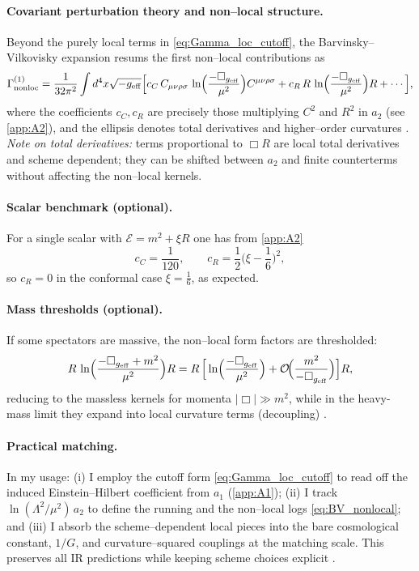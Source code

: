 \documentclass{iopjournal}
\begin{document}
\paragraph{Covariant perturbation theory and non–local structure.}
Beyond the purely local terms in \eqref{eq:Gamma_loc_cutoff}, the Barvinsky–Vilkovisky expansion resums the first non–local contributions as
\begin{equation}
\Gamma^{(1)}_{\rm nonloc}
=\frac{1}{32\pi^2}\int d^4x\sqrt{-g_{\rm eff}} 
\Big[
c_C\,C_{\mu\nu\rho\sigma}\,\ln\!\Big(\frac{-\Box_{g_{\rm eff}}}{\mu^2}\Big)C^{\mu\nu\rho\sigma}
+c_R\,R\,\ln\!\Big(\frac{-\Box_{g_{\rm eff}}}{\mu^2}\Big)R
+\cdots\Big],
\label{eq:BV_nonlocal}
\end{equation}
where the coefficients $c_C,c_R$ are precisely those multiplying $C^2$ and $R^2$ in $a_2$ (see \cref{app:A2}), and the ellipsis denotes total derivatives and higher–order curvatures \cite{BarvinskyVilkovisky1990,Donoghue1994}. \emph{Note on total derivatives:} terms proportional to $\Box R$ are local total derivatives and scheme dependent; they can be shifted between $a_2$ and finite counterterms without affecting the non–local kernels.

\paragraph{Scalar benchmark (optional).}
For a single scalar with $\mathcal{E}=m^2+\xi R$ one has from \cref{app:A2}
\begin{equation}
c_C=\frac{1}{120},\qquad
c_R=\frac{1}{2}\Big(\xi-\frac{1}{6}\Big)^{\!2},
\end{equation}
so $c_R=0$ in the conformal case $\xi=\tfrac{1}{6}$, as expected.

\paragraph{Mass thresholds (optional).}
If some spectators are massive, the non–local form factors are thresholded:
\begin{equation}
R\,\ln\!\Big(\frac{-\Box_{g_{\rm eff}}+m^2}{\mu^2}\Big)R
= R\,\Big[\ln\!\Big(\frac{-\Box_{g_{\rm eff}}}{\mu^2}\Big)+\mathcal{O}\!\Big(\frac{m^2}{-\Box_{g_{\rm eff}}}\Big)\Big]R,
\end{equation}
reducing to the massless kernels for momenta $|\Box|\gg m^2$, while in the heavy-mass limit they expand into local curvature terms (decoupling) \cite{Donoghue1994,BarvinskyVilkovisky1990}.

\paragraph{Practical matching.}
In my usage:
(i) I employ the cutoff form \eqref{eq:Gamma_loc_cutoff} to read off the induced Einstein–Hilbert coefficient from $a_1$ (\cref{app:A1});
(ii) I track $\ln(\Lambda^2/\mu^2)\,a_2$ to define the running and the non–local logs \eqref{eq:BV_nonlocal}; and
(iii) I absorb the scheme–dependent local pieces into the bare cosmological constant, $1/G$, and curvature–squared couplings at the matching scale. This preserves all IR predictions while keeping scheme choices explicit \cite{ParkerToms,Vassilevich2003,BarvinskyVilkovisky1990}.
\end{document}
